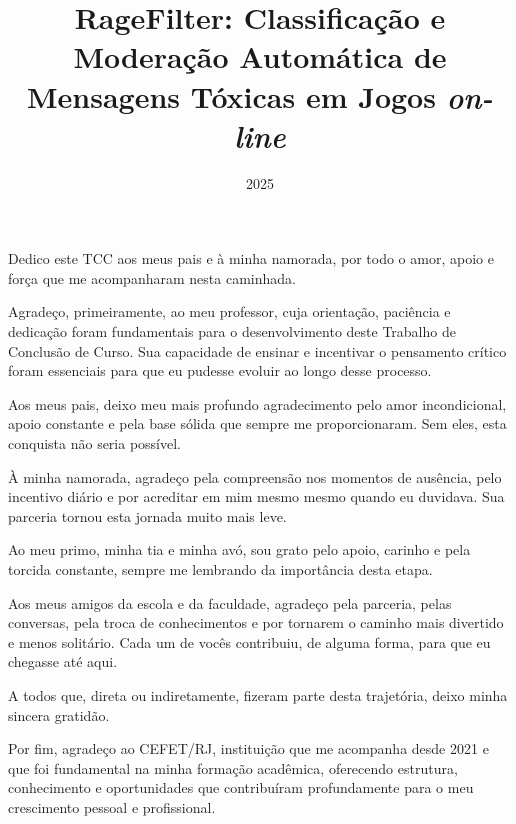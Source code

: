 \documentclass{eic-bcc-tcc}
\title{RageFilter: Classificação e Moderação Automática de Mensagens Tóxicas em Jogos \textit{ on-line }}
\date{2025}
\begin{document}
\maketitle

\begin{dedicatoria}
Dedico este TCC aos meus pais e à minha namorada, por todo o amor, apoio e força que me acompanharam nesta caminhada.
\end{dedicatoria}


\begin{agradecimentos}
Agradeço, primeiramente, ao meu professor, cuja orientação, paciência e dedicação foram fundamentais para o desenvolvimento deste Trabalho de Conclusão de Curso. Sua capacidade de ensinar e incentivar o pensamento crítico foram essenciais para que eu pudesse evoluir ao longo desse processo.

Aos meus pais, deixo meu mais profundo agradecimento pelo amor incondicional, apoio constante e pela base sólida que sempre me proporcionaram. Sem eles, esta conquista não seria possível.

À minha namorada, agradeço pela compreensão nos momentos de ausência, pelo incentivo diário e por acreditar em mim mesmo mesmo quando eu duvidava. Sua parceria tornou esta jornada muito mais leve.

Ao meu primo, minha tia e minha avó, sou grato pelo apoio, carinho e pela torcida constante, sempre me lembrando da importância desta etapa.

Aos meus amigos da escola e da faculdade, agradeço pela parceria, pelas conversas, pela troca de conhecimentos e por tornarem o caminho mais divertido e menos solitário. Cada um de vocês contribuiu, de alguma forma, para que eu chegasse até aqui.

A todos que, direta ou indiretamente, fizeram parte desta trajetória, deixo minha sincera gratidão.

Por fim, agradeço ao CEFET/RJ, instituição que me acompanha desde 2021 e que foi fundamental na minha formação acadêmica, oferecendo estrutura, conhecimento e oportunidades que contribuíram profundamente para o meu crescimento pessoal e profissional.
\end{agradecimentos}
\end{document}
